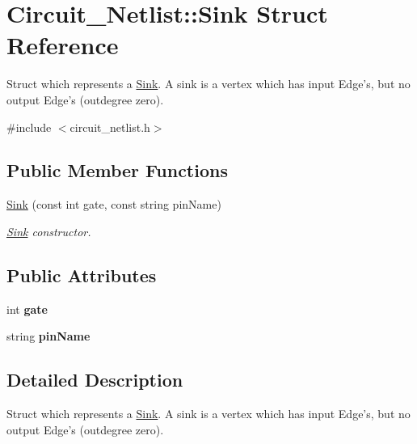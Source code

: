 \hypertarget{structCircuit__Netlist_1_1Sink}{\section{Circuit\-\_\-\-Netlist\-:\-:Sink Struct Reference}
\label{structCircuit__Netlist_1_1Sink}
}


Struct which represents a \hyperlink{structCircuit__Netlist_1_1Sink}{Sink}. A sink is a vertex which has input Edge's, but no output Edge's (outdegree zero).  




{\ttfamily \#include $<$circuit\-\_\-netlist.\-h$>$}

\subsection*{Public Member Functions}
\begin{DoxyCompactItemize}
\item 
\hyperlink{structCircuit__Netlist_1_1Sink_ad56d7d6a65455ec3e328d4bb8876936f}{Sink} (const int gate, const string pin\-Name)
\begin{DoxyCompactList}\small\item\em \hyperlink{structCircuit__Netlist_1_1Sink}{Sink} constructor. \end{DoxyCompactList}\end{DoxyCompactItemize}
\subsection*{Public Attributes}
\begin{DoxyCompactItemize}
\item 
\hypertarget{structCircuit__Netlist_1_1Sink_a5728898bf1ef8a37b46f0f6274676889}{int {\bfseries gate}}\label{structCircuit__Netlist_1_1Sink_a5728898bf1ef8a37b46f0f6274676889}

\item 
\hypertarget{structCircuit__Netlist_1_1Sink_ac2072a83f3d654b10f6ad0b2049cc2e6}{string {\bfseries pin\-Name}}\label{structCircuit__Netlist_1_1Sink_ac2072a83f3d654b10f6ad0b2049cc2e6}

\end{DoxyCompactItemize}


\subsection{Detailed Description}
Struct which represents a \hyperlink{structCircuit__Netlist_1_1Sink}{Sink}. A sink is a vertex which has input Edge's, but no output Edge's (outdegree zero). 



